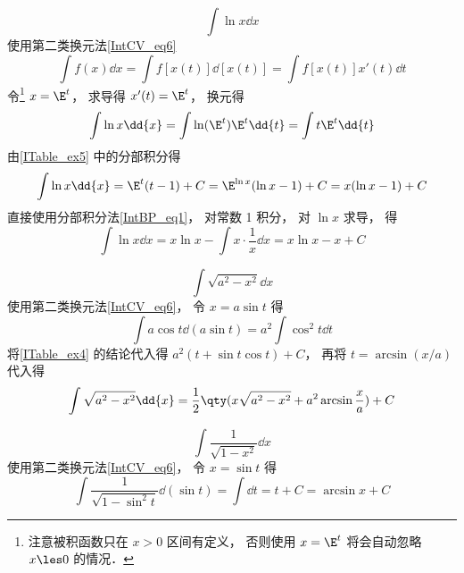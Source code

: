 \begin{exam}{}\label{ITable_ex6}
\begin{equation}
\int \ln x \dd{x}
\end{equation}
 使用第二类换元法\autoref{IntCV_eq6}
\begin{equation}
\int f(x) \dd{x} = \int f[x(t)] \dd{[x(t)]} = \int f[x(t)]x'(t) \dd{t}
\end{equation}
令\footnote{注意被积函数只在 $x>0$ 区间有定义， 否则使用 $x = \E^t$ 将会自动忽略 $x\les 0$ 的情况．} $x = \E^t$， 求导得 $x'(t) = \E^t$， 换元得
\begin{equation}
\int \ln x \dd{x} = \int \ln(\E^t) \E^t  \dd{t} = \int t \E^t  \dd{t}
\end{equation}
由\autoref{ITable_ex5} 中的分部积分得
\begin{equation}
\int \ln x \dd{x} = \E^t (t-1) + C = \E^{\ln x} (\ln x -1) + C = x (\ln x-1) + C
\end{equation}
 直接使用分部积分法\autoref{IntBP_eq1}， 对常数 1 积分， 对 $\ln x$ 求导， 得
\begin{equation}
\int \ln x \dd{x} = x\ln x - \int x\cdot \frac1x \dd{x} = x\ln x - x + C
\end{equation}
\end{exam}

\begin{exam}{}\label{ITable_ex12}
\begin{equation}
\int \sqrt{a^2 - x^2} \dd{x}
\end{equation}
使用第二类换元法\autoref{IntCV_eq6}， 令 $x = a\sin t$ 得
\begin{equation}
\int a\cos t \dd(a\sin t) = a^2 \int \cos^2 t \dd{t}
\end{equation}
将\autoref{ITable_ex4} 的结论代入得 $a^2(t + \sin t\cos t) + C$， 再将 $t = \arcsin(x/a)$ 代入得
\begin{equation}
\int \sqrt{a^2 - x^2}\dd{x} = \frac12 \qty(x\sqrt{a^2 - x^2} + a^2\arcsin\frac{x}{a}) + C
\end{equation}
\end{exam}

\begin{exam}{}\label{ITable_ex8}
\begin{equation}
\int \frac{1}{\sqrt{1-x^2}} \dd{x} 
\end{equation}
使用第二类换元法\autoref{IntCV_eq6}， 令 $x = \sin t$ 得
\begin{equation}
\int \frac{1}{\sqrt{1-\sin^2 t}} \dd(\sin t) = \int \dd{t} = t + C = \arcsin x + C
\end{equation}
\end{exam}

